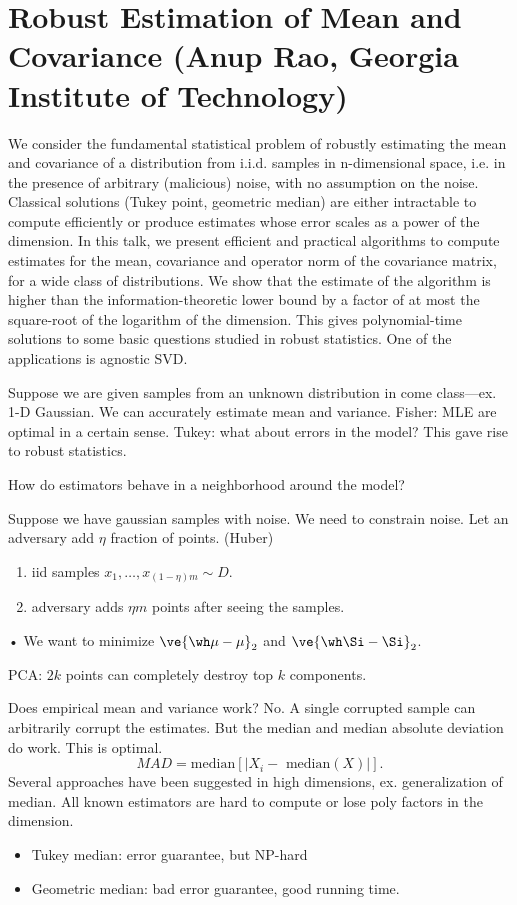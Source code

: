 \section{Robust Estimation of Mean and Covariance (Anup Rao, Georgia Institute of Technology)}


We consider the fundamental statistical problem of robustly estimating the mean and covariance of a distribution from i.i.d. samples in n-dimensional space, i.e. in the presence of arbitrary (malicious) noise, with no assumption on the noise. Classical solutions (Tukey point, geometric median) are either intractable to compute efficiently or produce estimates whose error scales as a power of the dimension. In this talk, we present efficient and practical algorithms to compute estimates for the mean, covariance and operator norm of the covariance matrix, for a wide class of distributions. We show that the estimate of the algorithm is higher than the information-theoretic lower bound by a factor of at most the square-root of the logarithm of the dimension. This gives polynomial-time solutions to some basic questions studied in robust statistics. One of the applications is agnostic SVD.

Suppose we are given samples from an unknown distribution in come class---ex. 1-D Gaussian. We can accurately estimate mean and variance. 
Fisher: MLE are optimal in a certain sense. Tukey: what about errors in the model? This gave rise to robust statistics.

How do estimators behave in a neighborhood around the model? 

Suppose we have gaussian samples with noise. We need to constrain noise. Let an adversary add $\eta$ fraction of points. (Huber)
\begin{enumerate}
\item
iid samples $x_1,\ldots, x_{(1-\eta)m}\sim D$.
\item
adversary adds $\eta m$ points after seeing the samples.
\end{enumerate}•
We want to minimize $\ve{\wh \mu-\mu}_2$ and $\ve{\wh \Si - \Si}_2$. 

PCA: $2k$ points can completely destroy top $k$ components.

Does empirical mean and variance work? No. A single corrupted sample can arbitrarily corrupt the estimates. 
But the median and median absolute deviation do work. This is optimal.
$$
MAD = \text{median}[|X_i -\text{ median}(X)|].
$$
Several approaches have been suggested in high dimensions, ex. generalization of median. 
All known estimators are hard to compute or lose poly factors in the dimension.
\begin{itemize}
\item
Tukey median: error guarantee, but NP-hard
\item
Geometric median: bad error guarantee, good running time.
\end{itemize}

